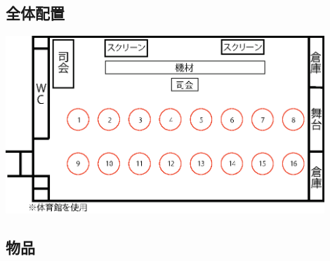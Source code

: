 \subsection{全体配置}
\begin{center}
\includegraphics[width=12cm]{./21/reiout1.eps}
\label{fig:ice}

\end{center}

\subsection{物品}
